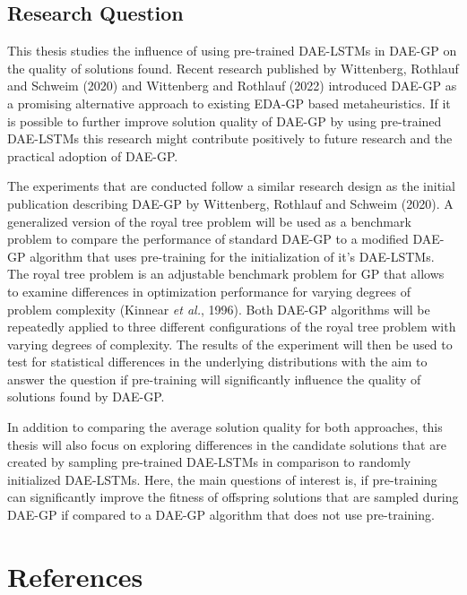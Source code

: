\documentclass[
  12pt,
]{article}
\begin{document}
\hypertarget{research-question}{%
\subsection{Research Question}\label{research-question}}

This thesis studies the influence of using pre-trained DAE-LSTMs in
DAE-GP on the quality of solutions found. Recent research published by
Wittenberg, Rothlauf and Schweim (2020) and Wittenberg and Rothlauf
(2022) introduced DAE-GP as a promising alternative approach to existing
EDA-GP based metaheuristics. If it is possible to further improve
solution quality of DAE-GP by using pre-trained DAE-LSTMs this research
might contribute positively to future research and the practical
adoption of DAE-GP.

The experiments that are conducted follow a similar research design as
the initial publication describing DAE-GP by Wittenberg, Rothlauf and
Schweim (2020). A generalized version of the royal tree problem will be
used as a benchmark problem to compare the performance of standard
DAE-GP to a modified DAE-GP algorithm that uses pre-training for the
initialization of it's DAE-LSTMs. The royal tree problem is an
adjustable benchmark problem for GP that allows to examine differences
in optimization performance for varying degrees of problem complexity
(Kinnear \emph{et al.}, 1996). Both DAE-GP algorithms will be repeatedly
applied to three different configurations of the royal tree problem with
varying degrees of complexity. The results of the experiment will then
be used to test for statistical differences in the underlying
distributions with the aim to answer the question if pre-training will
significantly influence the quality of solutions found by DAE-GP.

In addition to comparing the average solution quality for both
approaches, this thesis will also focus on exploring differences in the
candidate solutions that are created by sampling pre-trained DAE-LSTMs
in comparison to randomly initialized DAE-LSTMs. Here, the main
questions of interest is, if pre-training can significantly improve the
fitness of offspring solutions that are sampled during DAE-GP if
compared to a DAE-GP algorithm that does not use pre-training.

\newpage

\hypertarget{I}{%
\section*{References}\label{I}}
\end{document}
